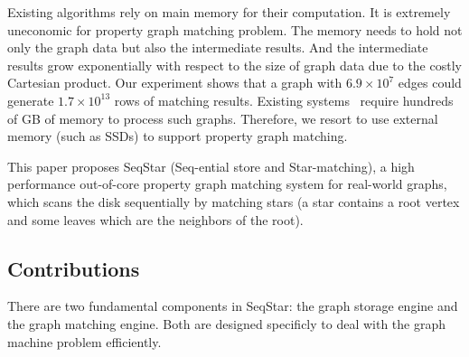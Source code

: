 
Existing algorithms rely on main memory for their computation. It is extremely uneconomic for property graph matching problem. The memory needs to hold not only the graph data but also the intermediate results.
And the intermediate results grow exponentially with respect to the size of graph data due to the costly Cartesian product.
Our experiment shows that a graph with $6.9 \times 10^{7}$ edges could generate $1.7 \times 10^{13}$ rows of matching results.
Existing systems~\cite{DBLP:conf/sosp/TeixeiraFSSZA15,DBLP:conf/sigmod/DiasTGM019,DBLP:journals/pvldb/MhedhbiS19} require hundreds of GB of memory to process such graphs. Therefore, we resort to use external memory (such as SSDs) to support property graph matching.

This paper proposes SeqStar (Seq-ential store and Star-matching), a high performance out-of-core property graph matching system for real-world graphs, which scans the disk sequentially by matching stars (a star contains a root vertex and some leaves which are the neighbors of the root).


\subsection*{Contributions}
There are two fundamental components in SeqStar:
the graph storage engine and the graph matching engine. Both are designed specificly to deal with the graph machine problem efficiently.

